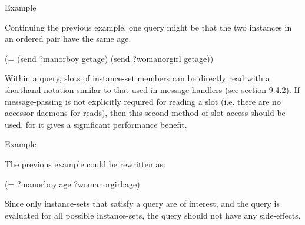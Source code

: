 \documentclass[letterpaper,10pt,english]{sphinxmanual}
\begin{document}

\begin{sphinxVerbatim}[commandchars=\\\{\}]
  
\end{sphinxVerbatim}

Example

Continuing the previous example, one query might be that the two
instances in an ordered pair have the same age.

\begin{sphinxVerbatim}[commandchars=\\\{\}]
(= (send ?man\PYGZhy{}or\PYGZhy{}boy get\PYGZhy{}age) (send ?woman\PYGZhy{}or\PYGZhy{}girl get\PYGZhy{}age))
\end{sphinxVerbatim}

Within a query, slots of instance-set members can be directly read with
a shorthand notation similar to that used in message-handlers (see
section 9.4.2). If message-passing is not explicitly required for
reading a slot (i.e. there are no accessor daemons for reads), then this
second method of slot access should be used, for it gives a significant
performance benefit.


\begin{sphinxVerbatim}[commandchars=\\\{\}]
\end{sphinxVerbatim}

Example

The previous example could be rewritten as:

\begin{sphinxVerbatim}[commandchars=\\\{\}]
(= ?man\PYGZhy{}or\PYGZhy{}boy:age ?woman\PYGZhy{}or\PYGZhy{}girl:age)
\end{sphinxVerbatim}

Since only instance-sets that satisfy a query are of interest, and the
query is evaluated for all possible instance-sets, the query should not
have any side-effects.
\end{document}
